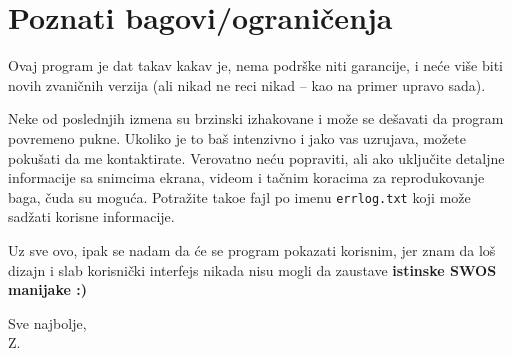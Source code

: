 \documentclass[a4paper,12pt]{article}
\begin{document}
\newpage
\section{Poznati bagovi/ograni\v cenja}

Ovaj program je dat takav kakav je, nema podr\v ske niti garancije, i ne\'ce vi\v se biti novih zvani\v cnih
verzija (ali nikad ne reci nikad -- kao na primer upravo sada).

Neke od poslednjih izmena su brzinski izhakovane i mo\v ze se de\v savati da program povremeno pukne. Ukoliko je
to ba\v s intenzivno i jako vas uzrujava, mo\v zete poku\v sati da me kontaktirate. Verovatno ne\'cu popraviti,
ali ako uklju\v cite detaljne informacije sa snimcima ekrana, videom i ta\v cnim koracima za reprodukovanje baga,
\v cuda su mogu\'ca. Potra\v zite tako\dj e fajl po imenu \verb|errlog.txt| koji mo\v ze sad\v zati korisne
informacije.

Uz sve ovo, ipak se nadam da \'ce se program pokazati korisnim, jer znam da lo\v s dizajn i slab korisni\v cki
interfejs nikada nisu mogli da zaustave {\bf istinske SWOS manijake :)}

\vspace{\baselineskip}
\noindent Sve najbolje,\\
Z.
\end{document}
